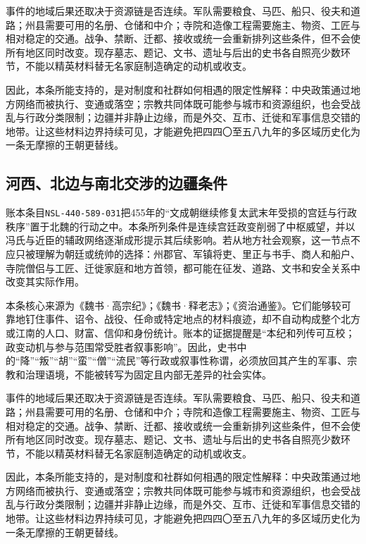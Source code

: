 事件的地域后果还取决于资源链是否连续。军队需要粮食、马匹、船只、役夫和道路；州县需要可用的名册、仓储和中介；寺院和造像工程需要施主、物资、工匠与相对稳定的交通。战争、禁断、迁都、接收或统一会重新排列这些条件，但不会使所有地区同时改变。现存墓志、题记、文书、遗址与后出的史书各自照亮少数环节，不能以精英材料替无名家庭制造确定的动机或收支。

因此，本条所能支持的，是对制度和社群如何相遇的限定性解释：中央政策通过地方网络而被执行、变通或落空；宗教共同体既可能参与城市和资源组织，也会受战乱与行政分类限制；边疆并非静止边缘，而是外交、互市、迁徙和军事信息交错的地带。让这些材料边界持续可见，才能避免把四四〇至五八九年的多区域历史化为一条无摩擦的王朝更替线。

\subsection{河西、北边与南北交涉的边疆条件}

账本条目\texttt{NSL-440-589-031}把455年的“文成朝继续修复太武末年受损的宫廷与行政秩序”置于北魏的行动之中。本条所列条件是连续宫廷政变削弱了中枢威望，并以冯氏与近臣的辅政网络逐渐成形提示其后续影响。若从地方社会观察，这一节点不应只被理解为朝廷或统帅的选择：州郡官、军镇将吏、里正与书手、商人和船户、寺院僧侣与工匠、迁徙家庭和地方首领，都可能在征发、道路、文书和安全关系中改变其实际作用。

本条核心来源为《魏书·高宗纪》；《魏书·释老志》；《资治通鉴》。它们能够较可靠地钉住事件、诏令、战役、任命或特定地点的材料痕迹，却不自动构成整个北方或江南的人口、财富、信仰和身份统计。账本的证据提醒是“本纪和列传可互校；政变动机与参与范围常受胜者叙事影响”。因此，史书中的“降”“叛”“胡”“蛮”“僧”“流民”等行政或叙事性称谓，必须放回其产生的军事、宗教和治理语境，不能被转写为固定且内部无差异的社会实体。

事件的地域后果还取决于资源链是否连续。军队需要粮食、马匹、船只、役夫和道路；州县需要可用的名册、仓储和中介；寺院和造像工程需要施主、物资、工匠与相对稳定的交通。战争、禁断、迁都、接收或统一会重新排列这些条件，但不会使所有地区同时改变。现存墓志、题记、文书、遗址与后出的史书各自照亮少数环节，不能以精英材料替无名家庭制造确定的动机或收支。

因此，本条所能支持的，是对制度和社群如何相遇的限定性解释：中央政策通过地方网络而被执行、变通或落空；宗教共同体既可能参与城市和资源组织，也会受战乱与行政分类限制；边疆并非静止边缘，而是外交、互市、迁徙和军事信息交错的地带。让这些材料边界持续可见，才能避免把四四〇至五八九年的多区域历史化为一条无摩擦的王朝更替线。

